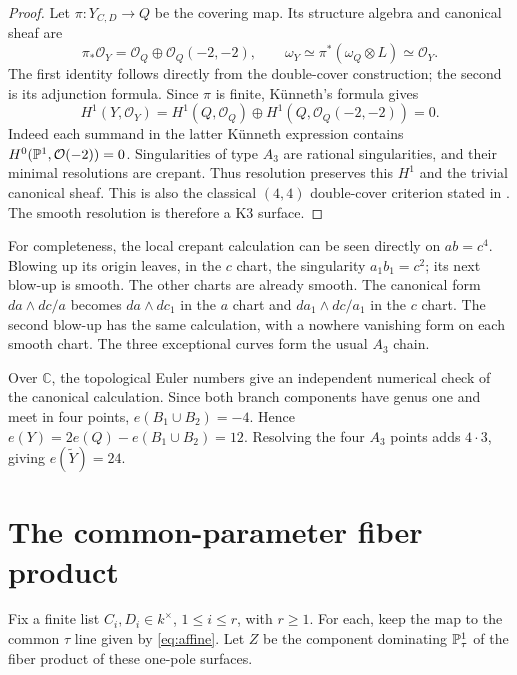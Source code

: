 \documentclass[11pt,a4paper]{article}
\newcommand{\OO}{\mathcal O}
\begin{document}
\begin{proof}
Let $\pi:Y_{C,D}\to Q$ be the covering map. Its structure algebra
and canonical sheaf are
\[
 \pi_*\OO_Y=\OO_Q\oplus\OO_Q(-2,-2),\qquad
 \omega_Y\simeq\pi^*(\omega_Q\otimes L)\simeq\OO_Y.
\]
The first identity follows directly from the double-cover construction;
the second is its adjunction formula. Since $\pi$ is finite,
K\"unneth's formula gives
\[
 H^1(Y,\OO_Y)
 =H^1(Q,\OO_Q)\oplus H^1(Q,\OO_Q(-2,-2))=0.
\]
Indeed each summand in the latter K\"unneth expression contains
$H^0(\Pp^1,\OO(-2))=0$. Singularities of type $A_3$ are rational
singularities, and their minimal resolutions are crepant.
Thus resolution preserves this $H^1$ and the trivial canonical
sheaf. This is also the classical $(4,4)$ double-cover criterion
stated in \cite[Section 3, p.~319]{AngermullerBarth}.
The smooth resolution is therefore a K3 surface.
\end{proof}

For completeness, the local crepant calculation can be seen directly
on $ab=c^4$. Blowing up its origin leaves, in the $c$ chart, the
singularity $a_1b_1=c^2$; its next blow-up is smooth. The other
charts are already smooth. The canonical form $da\wedge dc/a$
becomes $da\wedge dc_1$ in the $a$ chart and
$da_1\wedge dc/a_1$ in the $c$ chart. The second blow-up has
the same calculation, with a nowhere vanishing form on each smooth
chart. The three exceptional curves form the usual $A_3$ chain.

Over $\mathbb C$, the topological Euler numbers give an independent
numerical check of the canonical calculation.
Since both branch components have genus one and meet in four points,
$e(B_1\cup B_2)=-4$. Hence $e(Y)=2e(Q)-e(B_1\cup B_2)=12$.
Resolving the four $A_3$ points adds $4\cdot3$, giving
$e(\widetilde Y)=24$.

\section{The common-parameter fiber product}

Fix a finite list $C_i,D_i\in k^\times$, $1\le i\le r$, with
$r\ge1$. For each, keep the map to the common $\tau$ line given
by \eqref{eq:affine}. Let $Z$ be the component dominating
$\mathbb P^1_\tau$ of the fiber product of these one-pole surfaces.
\end{document}
